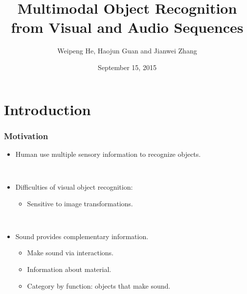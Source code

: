 \documentclass[t]{beamer}
\title{Multimodal Object Recognition from Visual and Audio Sequences}
\author{Weipeng He, Haojun Guan and Jianwei Zhang}
\date{September 15, 2015}
\begin{document}
\frame{\titlepage}

\section{Introduction}
\begin{frame}
  \frametitle{Motivation}

  \begin{itemize}
    \item Human use multiple sensory information to recognize objects.

      ~
    \item Difficulties of visual object recognition:
      \begin{itemize}
        \item Sensitive to image transformations. 
      \end{itemize}

      ~
    \item Sound provides complementary information.
      \begin{itemize}
        \item Make sound via interactions.
        \item Information about material. 
        \item Category by function: objects that make sound.
      \end{itemize}
  \end{itemize}
\end{frame}

\end{document}
